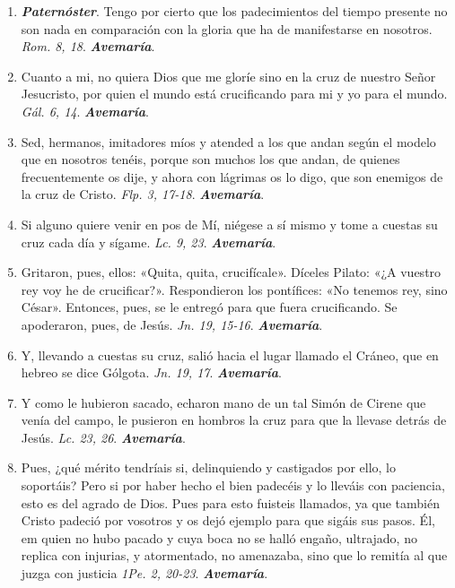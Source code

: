 \documentclass[./rosary.tex]{subfiles}
\begin{document}
\begin{enumerate}
    \item \textbf{\emph{Paternóster}}. Tengo por cierto que los padecimientos del tiempo presente no son nada en comparación con la gloria que ha
          de manifestarse en nosotros. \emph{Rom. 8, 18}. \textbf{\emph{Avemaría}}.

    \item Cuanto a mi, no quiera Dios que me gloríe sino en la cruz de nuestro Señor Jesucristo, por quien el mundo está crucificando
          para mi y yo para el mundo. \emph{Gál. 6, 14}. \textbf{\emph{Avemaría}}.

    \item Sed, hermanos, imitadores míos y atended a los que andan según el modelo que en nosotros tenéis, porque son muchos los que andan, de quienes frecuentemente
          os dije, y ahora con lágrimas os lo digo, que son enemigos de la cruz de Cristo. \emph{Flp. 3, 17-18}. \textbf{\emph{Avemaría}}.

    \item Si alguno quiere venir en pos de Mí, niégese a sí mismo y tome a cuestas su cruz cada día y sígame. \emph{Lc. 9, 23}. \textbf{\emph{Avemaría}}.

    \item Gritaron, pues, ellos: «Quita, quita, crucifícale». Díceles Pilato: «¿A vuestro rey voy he de crucificar?».
          Respondieron los pontífices: «No tenemos rey, sino César». Entonces, pues, se le entregó para que fuera crucificando.
          Se apoderaron, pues, de Jesús. \emph{Jn. 19, 15-16}. \textbf{\emph{Avemaría}}.

    \item Y, llevando a cuestas su cruz, salió hacia el lugar llamado el Cráneo, que en hebreo se dice Gólgota. \emph{Jn. 19, 17}. \textbf{\emph{Avemaría}}.

    \item Y como le hubieron sacado, echaron mano de un tal Simón de Cirene que venía del campo, le pusieron en hombros la cruz para que la llevase detrás de Jesús.
          \emph{Lc. 23, 26}. \textbf{\emph{Avemaría}}.

    \item Pues, ¿qué mérito tendríais si, delinquiendo y castigados por ello, lo soportáis? Pero si por haber hecho el bien padecéis y lo lleváis con paciencia,
          esto es del agrado de Dios. Pues para esto fuisteis llamados, ya que también Cristo padeció por vosotros y os dejó ejemplo para que sigáis sus pasos. Él,
          em quien no hubo pacado y cuya boca no se halló engaño, ultrajado, no replica con injurias, y atormentado, no amenazaba, sino que lo remitía al que juzga
          con justicia \emph{1Pe. 2, 20-23}. \textbf{\emph{Avemaría}}.


\end{enumerate}
\end{document}
